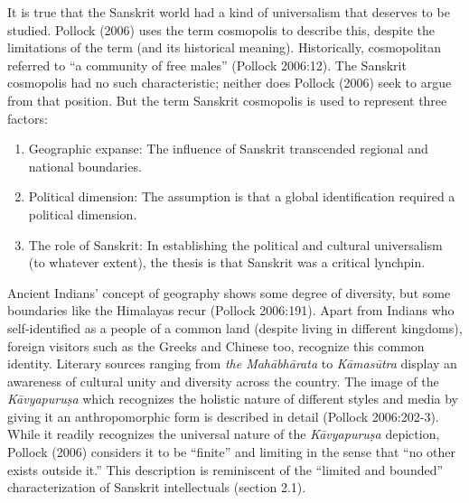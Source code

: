 It is true that the Sanskrit world had a kind of universalism that deserves to be studied. Pollock (2006) uses the term cosmopolis to describe this, despite the limitations of the term (and its historical meaning). Historically, cosmopolitan referred to “a community of free males” (Pollock 2006:12). The Sanskrit cosmopolis had no such characteristic; neither does Pollock (2006) seek to argue from that position. But the term Sanskrit cosmopolis is used to represent three factors: 
\begin{enumerate}
\itemsep=0pt
\item Geographic expanse: The influence of Sanskrit transcended regional and national boundaries.
\item Political dimension: The assumption is that a global identification required a political dimension. 
\item The role of Sanskrit: In establishing the political and cultural universalism (to whatever extent), the thesis is that Sanskrit was a critical lynchpin.
\end{enumerate}
Ancient Indians’ concept of geography shows some degree of diversity, but some boundaries like the Himalayas recur (Pollock 2006:191). Apart from Indians who self-identified as a people of a common land (despite living in different kingdoms), foreign visitors such as the Greeks and Chinese too, recognize this common identity. Literary sources ranging from {\sl the Mahābhārata} to {\sl Kāmasūtra} display an awareness of cultural unity and diversity across the country. The image of the {\sl Kāvyapuruṣa} which recognizes the holistic nature of different styles and media by giving it an anthropomorphic form is described in detail (Pollock 2006:202-3). While it readily recognizes the universal nature of the {\sl Kāvyapuruṣa} depiction, Pollock (2006) considers it to be “finite” and limiting in the sense that “no other exists outside it.” This description is reminiscent of the “limited and bounded” characterization of Sanskrit intellectuals (section 2.1).

